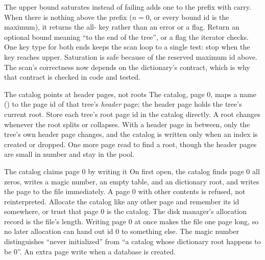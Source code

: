 \begin{decision}{The upper bound saturates instead of failing}
  adds one to the prefix with carry. When there
is nothing above the prefix ($n = 0$, or every bound id is the maximum), it
returns the all- key rather than an error or a flag.
 Return an optional bound meaning ``to the end of the
tree'', or a flag the iterator checks.
 One key type for both ends keeps the scan loop to a single test:
stop when the key reaches upper. Saturation is safe because of the reserved
maximum id above.
 The scan's correctness now depends on the dictionary's contract,
which is why that contract is checked in code and tested.
\end{decision}

\begin{decision}{The catalog points at header pages, not roots}
 The catalog, page 0, maps a name () to the page id
of that tree's \emph{header} page; the header page holds the tree's current
root.
 Store each tree's root page id in the catalog directly.
 A root changes whenever the root splits or collapses. With a header
page in between, only the tree's own header page changes, and the catalog is
written only when an index is created or dropped.
 One more page read to find a root, though the header pages are
small in number and stay in the pool.
\end{decision}

\begin{decision}{The catalog claims page 0 by writing it}
 On first open, the catalog finds page 0 all zeros, writes a
magic number, an empty table, and an  dictionary root,
and writes the page to the file immediately. A page 0 with other contents is
refused, not reinterpreted.
 Allocate the catalog like any other page and remember its
id somewhere, or trust that page 0 is the catalog.
 The disk manager's allocation record is the file's length. Writing
page 0 at once makes the file one page long, so no later allocation can hand
out id 0 to something else. The magic number distinguishes ``never
initialized'' from ``a catalog whose dictionary root happens to be 0''.
 An extra page write when a database is created.
\end{decision}

